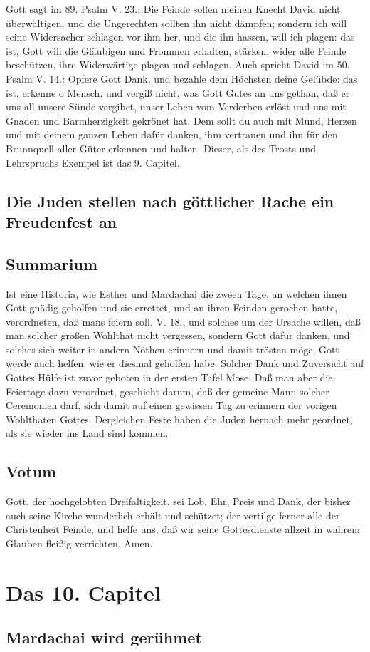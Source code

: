 Gott sagt im 89. Psalm V. 23.: Die Feinde sollen meinen Knecht David nicht überwältigen, und die Ungerechten sollten ihn nicht dämpfen; sondern ich will seine Widersacher schlagen vor ihm her, und die ihn hassen, will ich plagen: das ist, Gott will die Gläubigen und Frommen erhalten, stärken, wider alle Feinde beschützen, ihre Widerwärtige plagen und schlagen. Auch spricht David im 50. Psalm V. 14.: Opfere Gott Dank, und bezahle dem Höchsten deine Gelübde: das ist, erkenne o Mensch, und vergiß nicht, was Gott Gutes an uns gethan, daß er uns all unsere Sünde vergibet, unser Leben vom Verderben erlöst und uns mit Gnaden und Barmherzigkeit gekrönet hat. Dem sollt du auch mit Mund, Herzen und mit deinem ganzen Leben dafür danken, ihm vertrauen und ihn für den Brunnquell aller Güter erkennen und halten. Dieser, als des Trosts und Lehrspruchs Exempel ist das 9. Capitel.

\section[Die Juden stellen nach göttlicher Rache ein Freudenfest]{Die Juden stellen nach göttlicher Rache ein Freudenfest an}


\section{Summarium}

Ist eine Historia, wie Esther und Mardachai die zween Tage, an welchen ihnen Gott gnädig geholfen und sie errettet, und an ihren Feinden gerochen hatte, verordneten, daß mans feiern soll, V. 18., und solches um der Ursache willen, daß man solcher großen Wohlthat nicht vergessen, sondern Gott dafür danken, und solches sich weiter in andern Nöthen erinnern und damit trösten möge, Gott werde auch helfen, wie er diesmal geholfen habe. Solcher Dank und Zuversicht auf Gottes Hülfe ist zuvor geboten in der ersten Tafel Mose. Daß man aber die Feiertage dazu verordnet, geschieht darum, daß der gemeine Mann solcher Ceremonien darf, sich damit auf einen gewissen Tag zu erinnern der vorigen Wohlthaten Gottes. Dergleichen Feste haben die Juden hernach mehr geordnet, als sie wieder ins Land sind kommen.

\section{Votum}

Gott, der hochgelobten Dreifaltigkeit, sei Lob, Ehr, Preis und Dank, der bisher auch seine Kirche wunderlich erhält und schützet; der vertilge ferner alle der Christenheit Feinde, und helfe uns, daß wir seine Gottesdienste allzeit in wahrem Glauben fleißig verrichten, Amen.

\chapter{Das 10. Capitel}

\section{Mardachai wird gerühmet}
